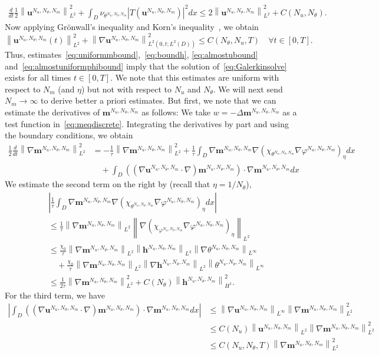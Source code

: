 \documentclass[10pt,letterpaper,twoside]{amsart}
\theoremstyle{definition}{\newtheorem{definition}[lemma]{Definition}}
\theoremstyle{note}{\newtheorem{claim}{Claim}[section]
\newtheorem*{claim*}{Claim}}
\numberwithin{equation}{section}
\newcommand{\dom}{D}
\newcommand{\norm}[1]{\left\| #1 \right\|}
\newcommand{\Grad}{\nabla}
\newcommand{\bma}{\mathbf{m}^{N_u,N_\theta,N_m}}
\newcommand{\bha}{\mathbf{h}^{N_u,N_\theta,N_m}}
\newcommand{\bua}{\mathbf{u}^{N_u,N_\theta,N_m}}
\newcommand{\tha}{\theta^{N_u,N_\theta,N_m}}
\newcommand{\pha}{\varphi^{N_u,N_\theta,N_m}}
\begin{document}
\begin{multline}
	\label{eq:basicuestimate2}
	\frac{d}{dt}\frac12\norm{\bua}_{L^2}^2
	+\int_{\dom}\nu_{\tha} |T(\bua)|^2 dx \leq 2\norm{\bua}_{L^2}^2 
    +  C(N_u, N_\theta) .
\end{multline}
Now applying Gr\"onwall's inequality and Korn's inequality~\cite{Korn1909}, we obtain
\begin{equation}\label{eq:almostubound}
	\norm{\bua(t)}_{L^2}^2 + \norm{\Grad\bua}_{L^2(0,t;L^2(\dom))}^2 \leq C(N_\theta,N_u,T) \quad \forall t\in [0,T].
\end{equation}
Thus, estimates~\eqref{eq:uniformmbound},~\eqref{eq:boundh}, \eqref{eq:almostubound} and~\eqref{eq:almostuniformphibound} imply that the solution of~\eqref{eq:Galerkinsolve} exists for all times $t\in [0,T]$. We note that this estimates are uniform with respect to $N_m$ (and $\eta$) but not with respect to $N_u$ and $N_\theta$. We will next send $N_m\to\infty$ to derive better a priori estimates.  But first, we note that we can estimate the derivatives of $\bma$ as follows:
We take $w=-\Delta \bma$ as a test function in~\eqref{eq:meqdiscrete}. Integrating the derivatives by part and using the boundary conditions, we obtain
\begin{align*}
	\frac12\frac{d}{dt}\norm{\Grad \bma}_{L^2}^2& = -\frac{1}{\tau}\norm{\Grad\bma}_{L^2}^2 + \frac{1}{\tau}\int_{\dom} \Grad\bma \Grad(\chi_{\tha}\Grad\pha)_{\eta} dx\\
	&\quad  + \int_{\dom} ((\Grad\bua\cdot\Grad)\bma) \cdot \Grad\bma dx 
\end{align*}
We estimate the second term on the right by  (recall that $\eta = 1/N_\theta$),
\begin{align*}
	&\left|\frac{1}{\tau}\int_{\dom} \Grad\bma \Grad(\chi_{\tha}\Grad\pha)_{\eta} dx\right|\\
	& \leq \frac{1}{\tau}\norm{\Grad\bma}_{L^2}\norm{\Grad(\chi_{\pha}\Grad\pha)_{\eta}}_{L^2}\\
	& \leq \frac{\chi_0}{\tau }\norm{\Grad\bma}_{L^2}\norm{\bha}_{L^2}\norm{\Grad\tha}_{L^\infty} \\
	&\quad + \frac{\chi_0}{\tau}\norm{\Grad\bma}_{L^2}\norm{\Grad\bha}_{L^2}\norm{\tha}_{L^\infty} \\
	& \leq \frac{1}{2\tau}\norm{\Grad\bma}_{L^2}^2 + C(N_\theta) \norm{\bha}_{H^1}^2.
\end{align*}
For the third term, we have
\begin{align*}
	\left| \int_{\dom} ((\Grad\bua\cdot\Grad)\bma) \cdot \Grad\bma dx \right|& \leq \norm{\Grad\bua}_{L^\infty}\norm{\Grad\bma}_{L^2}^2\\
	& \leq C(N_u)\norm{\bua}_{L^2}\norm{\Grad\bma}_{L^2}^2\\
	&\leq C(N_u , N_\theta,T)\norm{\Grad\bma}_{L^2}^2
\end{align*}
\end{document}
